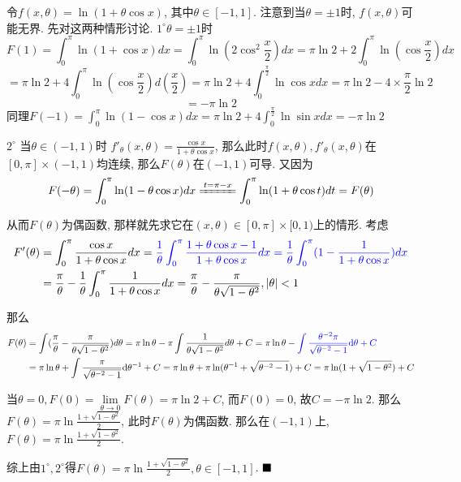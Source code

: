 \documentclass[lang=cn,newtx,10pt,scheme=chinese]{elegantbook}
\begin{document}
\begin{solution}
令$f(x, \theta) = \ln(1+\theta \cos x)$, 其中$\theta \in [-1, 1]$. 注意到当$\theta = \pm 1$时, $f(x, \theta)$可能无界. 先对这两种情形讨论.
$1^\circ \theta = \pm 1$时
$$F(1) = \int_{0}^{\pi} \ln(1+\cos x)dx = \int_{0}^{\pi} \ln(2\cos^2\frac{x}{2})dx = \pi\ln2 + 2\int_{0}^{\pi}\ln(\cos\frac{x}{2})dx$$$$= \pi\ln2 + 4\int_{0}^{\pi}\ln(\cos\frac{x}{2})d(\frac{x}{2}) = \pi\ln2 + 4\int_{0}^{\frac{\pi}{2}}\ln\cos x dx = \pi\ln2 - 4 \times \frac{\pi}{2}\ln2$$$$= -\pi\ln2$$
同理$F(-1) = \int_{0}^{\pi} \ln(1-\cos x)dx = \pi\ln2 + 4\int_{0}^{\frac{\pi}{2}}\ln\sin x dx = -\pi\ln2$

$2^\circ$ 当$\theta \in (-1, 1)$时
$f'_{\theta}(x, \theta) = \frac{\cos x}{1+\theta \cos x}$, 那么此时$f(x, \theta), f'_{\theta}(x, \theta)$在$[0, \pi] \times (-1, 1)$均连续, 那么$F(\theta)$在$(-1, 1)$可导.
又因为
\begin{equation*}
F(-\theta) = \int_{0}^{\pi} \ln(1-\theta\cos x)dx \xlongequal{t=\pi-x} \int_{0}^{\pi} \ln(1+\theta\cos t)dt = F(\theta)
\end{equation*}

从而$F(\theta)$为偶函数, 那样就先求它在$(x, \theta) \in [0, \pi] \times [0, 1)$上的情形.
考虑
\begin{align*}
    F'(\theta) &= \int_{0}^{\pi} \frac{\cos x}{1+\theta \cos x}dx = \color{blue}{\frac{1}{\theta}\int_{0}^{\pi}\frac{1+\theta\cos x - 1}{1+\theta\cos x}dx} = \frac{1}{\theta}\int_{0}^{\pi}(1-\frac{1}{1+\theta\cos x})dx \\
               &= \frac{\pi}{\theta} - \frac{1}{\theta}\int_{0}^{\pi}\frac{1}{1+\theta\cos x}dx = \frac{\pi}{\theta} - \frac{\pi}{\theta\sqrt{1-\theta^2}}, |\theta|<1
\end{align*}


那么
\begin{align*}
    F(\theta)&=\int(\frac{\pi}{\theta}-\frac{\pi}{\theta\sqrt{1-\theta^2}})d\theta = \pi\ln\theta - \pi\int\frac{1}{\theta\sqrt{1-\theta^2}}d\theta+C =\pi \ln \theta - \color{blue}{\int\frac{\theta^{-2}\pi}{\sqrt{\theta^{-2}-1}}\mathrm{d} \theta +C}\\
             &=\pi \ln \theta + \int\frac{\pi}{\sqrt{\theta^{-2}-1}}\mathrm{d} \theta^{-1} +C = \pi \ln \theta +\pi \ln(\theta^{-1}+\sqrt{\theta^{-2}-1})+C=\pi \ln (1+ \sqrt{1-\theta^2}) +C
\end{align*}

当$\theta=0, F(0)=\lim\limits_{\theta \to 0} F(\theta) = \pi\ln2+C$, 而$F(0)=0$, 故$C=-\pi\ln2$.
那么$F(\theta)=\pi\ln\frac{1+\sqrt{1-\theta^2}}{2}$, 此时$F(\theta)$为偶函数.
那么在$(-1, 1)$上,$F(\theta)=\pi\ln\frac{1+\sqrt{1-\theta^2}}{2}$.

综上由$1^\circ, 2^\circ$得$F(\theta)=\pi\ln\frac{1+\sqrt{1-\theta^2}}{2}, \theta \in [-1, 1]$.
$\hfill \blacksquare$
\end{solution}
\end{document}

